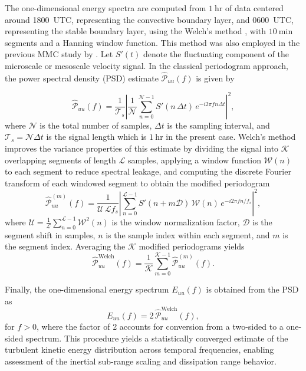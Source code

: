 The one-dimensional energy spectra are computed from $1~\mathrm{hr}$ of data centered around 1800~UTC, representing the convective boundary layer, and 0600~UTC, representing the stable boundary layer, using the Welch’s method \citep{welch2003use}, with $10~\mathrm{min}$ segments and a Hanning window function. This method was also employed in the previous MMC study by \citet{allaerts2020development}. Let $S'(t)$ denote the fluctuating component of the microscale or mesoscale velocity signal. In the classical periodogram approach, the power spectral density (PSD) estimate $\hat{\mathcal P}_{uu}(f)$ is given by

\begin{equation}
\hat{\mathcal P}_{uu}(f) = \frac{1}{\mathcal{T}_s} \left| \frac{1}{\mathcal N} \sum_{n=0}^{\mathcal N-1} S'(n \, \Delta t) \, e^{-i 2 \pi f n \Delta t} \right|^2,
\end{equation}
where $\mathcal N$ is the total number of samples, $\Delta t$ is the sampling interval, and $\mathcal T_s = \mathcal N \Delta t$ is the signal length which is $1~\mathrm{hr}$ in the present case. Welch’s method improves the variance properties of this estimate by dividing the signal into $\mathcal K$ overlapping segments of length $\mathcal {L}$ samples, applying a window function $\mathcal{W}(n)$ to each segment to reduce spectral leakage, and computing the discrete Fourier transform of each windowed segment to obtain the modified periodogram
\begin{equation}
\hat{\mathcal P}_{uu}^{(m)}(f) = \frac{1}{\mathcal U \, \mathcal L f_s} 
\left| \sum_{n=0}^{\mathcal L - 1} S'(n + m \mathcal D) \, \mathcal{W}(n) \, 
e^{-i 2 \pi f n / f_s} \right|^2,
\end{equation}
where $\mathcal U = \tfrac{1}{\mathcal L} \sum_{n=0}^{\mathcal L-1} \mathcal{W}^2(n)$ 
is the window normalization factor, $\mathcal D$ is the segment shift in samples, 
$n$ is the sample index within each segment, and $m$ is the segment index. 
Averaging the $\mathcal K$ modified periodograms yields
\begin{equation}
\hat{\mathcal P}_{uu}^{\mathrm{Welch}}(f) = \frac{1}{\mathcal K} \sum_{m=0}^{\mathcal K -1} 
\hat{\mathcal P}_{uu}^{(m)}(f).
\end{equation}

Finally, the one-dimensional energy spectrum $E_{uu}(f)$ is obtained from the PSD as
\begin{equation}
E_{uu}(f) = 2 \, \hat{\mathcal P}_{uu}^{\mathrm{Welch}}(f),
\end{equation}
for $f > 0$, where the factor of 2 accounts for conversion from a two-sided to a one-sided spectrum. This procedure yields a statistically converged estimate of the turbulent kinetic energy distribution across temporal frequencies, enabling assessment of the inertial sub-range scaling and dissipation range behavior.

